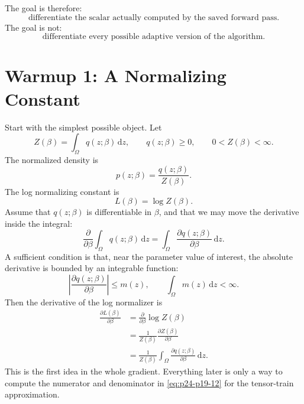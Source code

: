 \documentclass[11pt]{article}
\numberwithin{equation}{section}
\newcommand{\dd}{\,\mathrm d}
\begin{document}
The goal is therefore:
\begin{equation}
    \text{differentiate the scalar actually computed by the saved forward pass.}
    \label{eq:p24-p19-5}
\end{equation}
The goal is not:
\begin{equation}
    \text{differentiate every possible adaptive version of the algorithm.}
    \label{eq:p24-p19-6}
\end{equation}

\section{Warmup 1: A Normalizing Constant}

Start with the simplest possible object.  Let
\begin{equation}
    Z(\beta)=\int_\Omega q(z;\beta)\dd z,
    \qquad
    q(z;\beta)\ge 0,
    \qquad
    0<Z(\beta)<\infty.
    \label{eq:p24-p19-7}
\end{equation}
The normalized density is
\begin{equation}
    p(z;\beta)=\frac{q(z;\beta)}{Z(\beta)}.
    \label{eq:p24-p19-8}
\end{equation}
The log normalizing constant is
\begin{equation}
    L(\beta)=\log Z(\beta).
    \label{eq:p24-p19-9}
\end{equation}
Assume that \(q(z;\beta)\) is differentiable in \(\beta\), and that we may move
the derivative inside the integral:
\begin{equation}
    \frac{\partial}{\partial\beta}
    \int_\Omega q(z;\beta)\dd z
    =
    \int_\Omega
    \frac{\partial q(z;\beta)}{\partial\beta}\dd z.
    \label{eq:p24-p19-10}
\end{equation}
A sufficient condition is that, near the parameter value of interest, the
absolute derivative is bounded by an integrable function:
\begin{equation}
    \left|
    \frac{\partial q(z;\beta)}{\partial\beta}
    \right|
    \le m(z),
    \qquad
    \int_\Omega m(z)\dd z<\infty.
    \label{eq:p24-p19-11}
\end{equation}
Then the derivative of the log normalizer is
\begin{equation}
\begin{aligned}
    \frac{\partial L(\beta)}{\partial\beta}
    &=
    \frac{\partial}{\partial\beta}\log Z(\beta)\\
    &=
    \frac{1}{Z(\beta)}
    \frac{\partial Z(\beta)}{\partial\beta}\\
    &=
    \frac{1}{Z(\beta)}
    \int_\Omega
    \frac{\partial q(z;\beta)}{\partial\beta}\dd z.
\end{aligned}
\label{eq:p24-p19-12}
\end{equation}
This is the first idea in the whole gradient.  Everything later is only a way
to compute the numerator and denominator in \eqref{eq:p24-p19-12} for the tensor-train
approximation.
\end{document}
